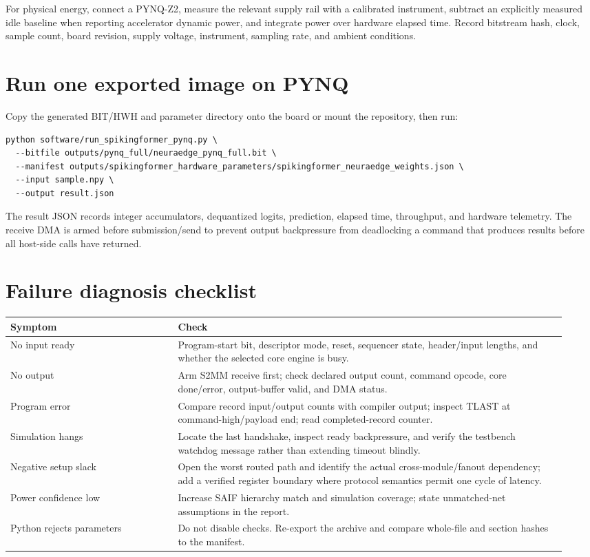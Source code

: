 \documentclass[10pt]{article}
\begin{document}
For physical energy, connect a PYNQ-Z2, measure the relevant supply rail with a
calibrated instrument, subtract an explicitly measured idle baseline when
reporting accelerator dynamic power, and integrate power over hardware elapsed
time. Record bitstream hash, clock, sample count, board revision, supply voltage,
instrument, sampling rate, and ambient conditions.

\section{Run one exported image on PYNQ}

Copy the generated BIT/HWH and parameter directory onto the board or mount the
repository, then run:

\begin{lstlisting}
python software/run_spikingformer_pynq.py \
  --bitfile outputs/pynq_full/neuraedge_pynq_full.bit \
  --manifest outputs/spikingformer_hardware_parameters/spikingformer_neuraedge_weights.json \
  --input sample.npy \
  --output result.json
\end{lstlisting}

The result JSON records integer accumulators, dequantized logits, prediction,
elapsed time, throughput, and hardware telemetry. The receive DMA is armed
before submission/send to prevent output backpressure from deadlocking a command
that produces results before all host-side calls have returned.

\section{Failure diagnosis checklist}

\begin{longtable}{p{0.29\linewidth}p{0.65\linewidth}}
\toprule
Symptom & Check\\
\midrule
\endhead
No input ready & Program-start bit, descriptor mode, reset, sequencer state,
header/input lengths, and whether the selected core engine is busy.\\
No output & Arm S2MM receive first; check declared output count, command opcode,
core done/error, output-buffer valid, and DMA status.\\
Program error & Compare record input/output counts with compiler output; inspect
TLAST at command-high/payload end; read completed-record counter.\\
Simulation hangs & Locate the last handshake, inspect ready backpressure, and
verify the testbench watchdog message rather than extending timeout blindly.\\
Negative setup slack & Open the worst routed path and identify the actual
cross-module/fanout dependency; add a verified register boundary where protocol
semantics permit one cycle of latency.\\
Power confidence low & Increase SAIF hierarchy match and simulation coverage;
state unmatched-net assumptions in the report.\\
Python rejects parameters & Do not disable checks. Re-export the archive and
compare whole-file and section hashes to the manifest.\\
\bottomrule
\end{longtable}
\end{document}
